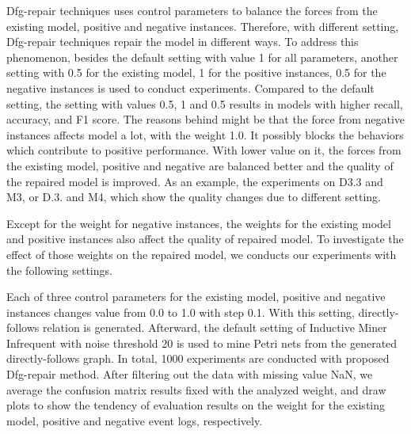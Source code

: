 Dfg-repair techniques uses control parameters to balance the forces from the existing model, positive and negative instances. Therefore, with different setting, Dfg-repair techniques repair the model in different ways. To address this phenomenon, besides the default setting with value 1 for all parameters, another setting with 0.5 for the existing model, 1 for the positive instances, 0.5 for the negative instances is used to conduct experiments.  Compared to the default setting, the setting with values 0.5, 1 and 0.5 results in models with higher recall, accuracy, and F1 score. The reasons behind might be that the force from negative instances affects model a lot, with the weight 1.0. It possibly blocks the behaviors which contribute to positive performance.  With lower value on it, the forces from the existing model, positive and negative are balanced better and the quality of the repaired model is improved. As an example, the experiments on D3.3 and M3, or D.3. and M4, which show the quality changes due to different setting.

Except for the weight for negative instances, the weights for the existing model and positive instances also affect the quality of repaired model. To investigate the effect of those weights on the repaired model, we conducts our experiments with the following settings.


Each of three control parameters for the existing model, positive and negative instances changes value from 0.0 to 1.0 with step 0.1. With this setting, directly-follows relation is generated. Afterward, the default setting of Inductive Miner Infrequent with noise threshold 20 is used to mine Petri nets from the generated directly-follows graph. In total, 1000 experiments are conducted with proposed Dfg-repair method. 
After filtering out the data with missing value NaN, we average the confusion matrix results fixed with the analyzed weight,  and draw plots to show the tendency of evaluation results on the weight for the existing model, positive and negative event logs, respectively. 

